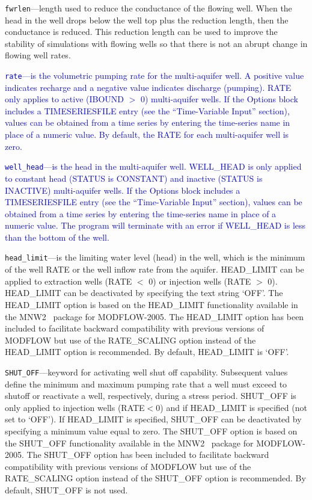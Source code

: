 \begin{description}
\item \texttt{fwrlen}---length used to reduce the conductance of the flowing well.  When the head in the well drops below the well top plus the reduction length, then the conductance is reduced.  This reduction length can be used to improve the stability of simulations with flowing wells so that there is not an abrupt change in flowing well rates.

\item \textcolor{blue}{\texttt{rate}---is the volumetric pumping rate for the multi-aquifer well. A positive value indicates recharge and a negative value indicates discharge (pumping). RATE only applies to active (IBOUND $>$ 0) multi-aquifer wells. If the Options block includes a TIMESERIESFILE entry (see the ``Time-Variable Input'' section), values can be obtained from a time series by entering the time-series name in place of a numeric value. By default, the RATE for each multi-aquifer well is zero.}

\item \textcolor{blue}{\texttt{well\_head}---is the head in the multi-aquifer well. WELL\_HEAD is only applied to constant head (STATUS is CONSTANT) and inactive (STATUS is INACTIVE) multi-aquifer wells. If the Options block includes a TIMESERIESFILE entry (see the ``Time-Variable Input'' section), values can be obtained from a time series by entering the time-series name in place of a numeric value. The program will terminate with an error if WELL\_HEAD is less than the bottom of the well.}

\item \texttt{head\_limit}---is the limiting water level (head) in the well, which is the minimum of the well RATE or the well inflow rate from the aquifer. HEAD\_LIMIT can be applied to extraction wells (RATE $<$ 0) or injection wells (RATE $>$ 0). HEAD\_LIMIT can be deactivated by specifying the text string `OFF'. The HEAD\_LIMIT option is based on the HEAD\_LIMIT functionality available in the MNW2~\citep{konikow2009} package for MODFLOW-2005. The HEAD\_LIMIT option has been included to facilitate backward compatibility with previous versions of MODFLOW but use of the RATE\_SCALING option instead of the HEAD\_LIMIT option is recommended. By default, HEAD\_LIMIT is `OFF'.

\item \texttt{SHUT\_OFF}---keyword for activating well shut off capability.  Subsequent values define the minimum and maximum pumping rate that a well must exceed to shutoff or reactivate a well, respectively, during a stress period. SHUT\_OFF is only applied to injection wells (RATE$<0$) and if HEAD\_LIMIT is specified (not set to `OFF').  If HEAD\_LIMIT is specified, SHUT\_OFF can be deactivated by specifying a minimum value equal to zero. The SHUT\_OFF option is based on the SHUT\_OFF functionality available in the MNW2~\citep{konikow2009} package for MODFLOW-2005. The SHUT\_OFF option has been included to facilitate backward compatibility with previous versions of MODFLOW but use of the RATE\_SCALING option instead of the SHUT\_OFF option is recommended. By default, SHUT\_OFF is not used.


\end{description}
